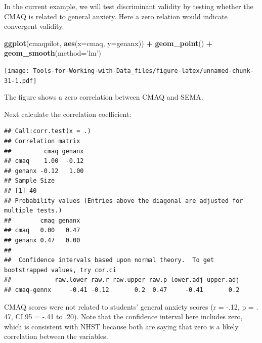 \documentclass[
]{book}
\newenvironment{Shaded}{\begin{snugshade}}{\end{snugshade}}
\newcommand{\DataTypeTok}[1]{\textcolor[rgb]{0.13,0.29,0.53}{#1}}
\newcommand{\KeywordTok}[1]{\textcolor[rgb]{0.13,0.29,0.53}{\textbf{#1}}}
\newcommand{\NormalTok}[1]{#1}
\newcommand{\OperatorTok}[1]{\textcolor[rgb]{0.81,0.36,0.00}{\textbf{#1}}}
\newcommand{\OtherTok}[1]{\textcolor[rgb]{0.56,0.35,0.01}{#1}}
\newcommand{\StringTok}[1]{\textcolor[rgb]{0.31,0.60,0.02}{#1}}
\begin{document}
In the current example, we will test discriminant validity by testing whether the CMAQ is related to general anxiety. Here a zero relation would indicate convergent validity.

\begin{Shaded}
\begin{Highlighting}[]
\KeywordTok{ggplot}\NormalTok{(cmaqpilot, }\KeywordTok{aes}\NormalTok{(}\DataTypeTok{x=}\NormalTok{cmaq, }\DataTypeTok{y=}\NormalTok{genanx)) }\OperatorTok{+}
\StringTok{  }\KeywordTok{geom_point}\NormalTok{() }\OperatorTok{+}
\StringTok{  }\KeywordTok{geom_smooth}\NormalTok{(}\DataTypeTok{method=}\StringTok{'lm'}\NormalTok{)}
\end{Highlighting}
\end{Shaded}

\texttt{[image: Tools-for-Working-with-Data\_files/figure-latex/unnamed-chunk-31-1.pdf]}

The figure shows a zero correlation between CMAQ and SEMA.

Next calculate the correlation coefficient:

\begin{Shaded}
\end{Shaded}

\begin{verbatim}
## Call:corr.test(x = .)
## Correlation matrix 
##         cmaq genanx
## cmaq    1.00  -0.12
## genanx -0.12   1.00
## Sample Size 
## [1] 40
## Probability values (Entries above the diagonal are adjusted for multiple tests.) 
##        cmaq genanx
## cmaq   0.00   0.47
## genanx 0.47   0.00
## 
##  Confidence intervals based upon normal theory.  To get bootstrapped values, try cor.ci
##            raw.lower raw.r raw.upper raw.p lower.adj upper.adj
## cmaq-gennx     -0.41 -0.12       0.2  0.47     -0.41       0.2
\end{verbatim}

CMAQ scores were not related to students' general anxiety scores (r = -.12, p = . 47, CI.95 = -.41 to .20). Note that the confidence interval here includes zero, which is consistent with NHST because both are saying that zero is a likely correlation between the variables.
\end{document}
